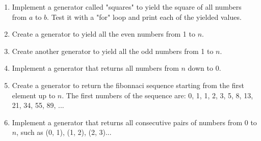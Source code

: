 \begin{enumerate}

\item Implement a generator called "squares" to yield the square of all numbers from $a$ to $b$. Test it with a "for" loop and print each of the yielded values.

\item Create a generator to yield all the even numbers from 1 to $n$.

\item Create another generator to yield all the odd numbers from 1 to $n$.

\item Implement a generator that returns all numbers from $n$ down to 0.

\item Create a generator to return the fibonnaci sequence starting from the first element up to $n$. The first numbers of the sequence are: 0, 1, 1, 2, 3, 5, 8, 13, 21, 34, 55, 89, ...

\item Implement a generator that returns all consecutive pairs of numbers from 0 to $n$, such as (0, 1), (1, 2), (2, 3)...

\end{enumerate}



